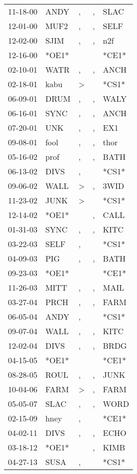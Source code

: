 \begin{supertabular}{lllll}
 11-18-00 &   ANDY &             , &  , &   SLAC \\
 12-01-00 &   MUF2 &             , &  , &   SELF \\
 12-02-00 &   SJIM &             , &  , &    n2f \\
 12-16-00 &  *OE1* &               &    &  *CE1* \\
 02-10-01 &   WATR &             , &  , &   ANCH \\
 02-18-01 &   kabu &  \textgreater &    &  *CS1* \\
 06-09-01 &   DRUM &             , &  , &   WALY \\
 06-16-01 &   SYNC &             , &  , &   ANCH \\
 07-20-01 &    UNK &             , &  , &    EX1 \\
 09-08-01 &   fool &             , &  , &   thor \\
 05-16-02 &   prof &             , &  , &   BATH \\
 06-13-02 &   DIVS &             , &    &  *CS1* \\
 09-06-02 &   WALL &  \textgreater &  , &   3WID \\
 11-23-02 &   JUNK &  \textgreater &    &  *CS1* \\
 12-14-02 &  *OE1* &               &  , &   CALL \\
 01-31-03 &   SYNC &             , &  , &   KITC \\
 03-22-03 &   SELF &             , &    &  *CS1* \\
 04-09-03 &    PIG &             , &  , &   BATH \\
 09-23-03 &  *OE1* &               &    &  *CE1* \\
 11-26-03 &   MITT &             , &  , &   MAIL \\
 03-27-04 &   PRCH &             , &  , &   FARM \\
 06-05-04 &   ANDY &             , &    &  *CS1* \\
 09-07-04 &   WALL &             , &  , &   KITC \\
 12-02-04 &   DIVS &             , &  , &   BRDG \\
 04-15-05 &  *OE1* &               &    &  *CE1* \\
 08-28-05 &   ROUL &             , &  , &   JUNK \\
 10-04-06 &   FARM &  \textgreater &  , &   FARM \\
 05-05-07 &   SLAC &             , &  , &   WORD \\
 02-15-09 &   hney &             , &    &  *CE1* \\
 04-02-11 &   DIVS &             , &  , &   ECHO \\
 03-18-12 &  *OE1* &               &  , &   KIMB \\
 04-27-13 &   SUSA &             , &    &  *CS1* \\
\end{supertabular}
